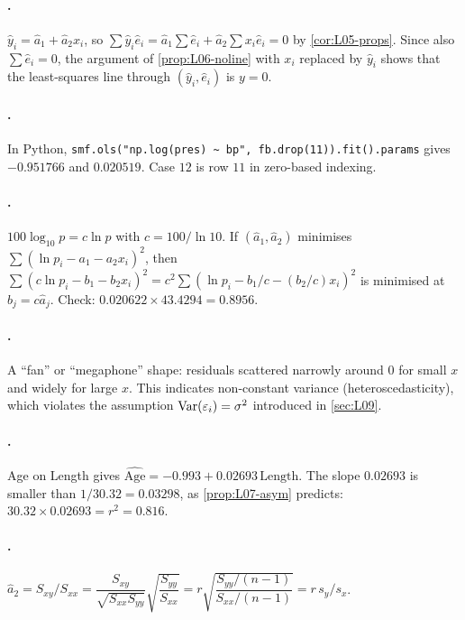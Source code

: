 \paragraph{.}
$\hat y_i=\hat a_1+\hat a_2x_i$, so $\sum\hat y_i\hat e_i=\hat a_1\sum\hat e_i+\hat a_2\sum x_i\hat e_i=0$
by \cref{cor:L05-props}. Since also $\sum\hat e_i=0$, the argument of \cref{prop:L06-noline}
with $x_i$ replaced by $\hat y_i$ shows that the least-squares line through $(\hat y_i,\hat e_i)$
is $y=0$.

\paragraph{.}
In Python, \texttt{smf.ols("np.log(pres) \textasciitilde\ bp", fb.drop(11)).fit().params} gives
$-0.951766$ and $0.020519$. Case $12$ is row $11$ in zero-based indexing.

\paragraph{.}
$100\log_{10}p=c\ln p$ with $c=100/\ln 10$. If $(\hat a_1,\hat a_2)$ minimises
$\sum(\ln p_i-a_1-a_2x_i)^2$, then $\sum(c\ln p_i-b_1-b_2x_i)^2=c^2\sum(\ln p_i-b_1/c-(b_2/c)x_i)^2$
is minimised at $b_j=c\hat a_j$. Check: $0.020622\times 43.4294=0.8956$.

\paragraph{.}
A ``fan'' or ``megaphone'' shape: residuals scattered narrowly around $0$ for small $x$ and
widely for large $x$. This indicates non-constant variance (heteroscedasticity), which violates
the assumption $\operatorname{Var}(\varepsilon_i)=\sigma^2$ introduced in \cref{sec:L09}.

\paragraph{.}
Age on Length gives $\widehat{\text{Age}}=-0.993+0.02693\,\text{Length}$. The slope $0.02693$ is
smaller than $1/30.32=0.03298$, as \cref{prop:L07-asym} predicts: $30.32\times0.02693=r^2=0.816$.

\paragraph{.}
$\hat a_2=S_{xy}/S_{xx}=\dfrac{S_{xy}}{\sqrt{S_{xx}S_{yy}}}\sqrt{\dfrac{S_{yy}}{S_{xx}}}
=r\sqrt{\dfrac{S_{yy}/(n-1)}{S_{xx}/(n-1)}}=r\,s_y/s_x$.

